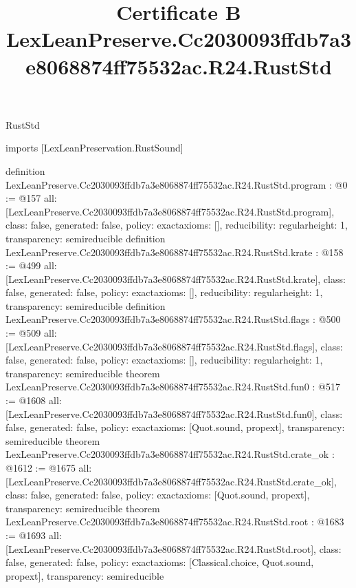 \begin{lexlean}{RustStd}
\title{Certificate B LexLeanPreserve.Cc2030093ffdb7a3e8068874ff75532ac.R24.RustStd}
\begin{coremodule}
imports [LexLeanPreservation.RustSound]

definition LexLeanPreserve.Cc2030093ffdb7a3e8068874ff75532ac.R24.RustStd.program : @0 := @157 {
  all: [LexLeanPreserve.Cc2030093ffdb7a3e8068874ff75532ac.R24.RustStd.program],
  class: false,
  generated: false,
  policy: exact{axioms: []},
  reducibility: regular{height: 1},
  transparency: semireducible
}
definition LexLeanPreserve.Cc2030093ffdb7a3e8068874ff75532ac.R24.RustStd.krate : @158 := @499 {
  all: [LexLeanPreserve.Cc2030093ffdb7a3e8068874ff75532ac.R24.RustStd.krate],
  class: false,
  generated: false,
  policy: exact{axioms: []},
  reducibility: regular{height: 1},
  transparency: semireducible
}
definition LexLeanPreserve.Cc2030093ffdb7a3e8068874ff75532ac.R24.RustStd.flags : @500 := @509 {
  all: [LexLeanPreserve.Cc2030093ffdb7a3e8068874ff75532ac.R24.RustStd.flags],
  class: false,
  generated: false,
  policy: exact{axioms: []},
  reducibility: regular{height: 1},
  transparency: semireducible
}
theorem LexLeanPreserve.Cc2030093ffdb7a3e8068874ff75532ac.R24.RustStd.fun0 : @517 := @1608 {
  all: [LexLeanPreserve.Cc2030093ffdb7a3e8068874ff75532ac.R24.RustStd.fun0],
  class: false,
  generated: false,
  policy: exact{axioms: [Quot.sound, propext]},
  transparency: semireducible
}
theorem LexLeanPreserve.Cc2030093ffdb7a3e8068874ff75532ac.R24.RustStd.crate_ok : @1612 := @1675 {
  all: [LexLeanPreserve.Cc2030093ffdb7a3e8068874ff75532ac.R24.RustStd.crate_ok],
  class: false,
  generated: false,
  policy: exact{axioms: [Quot.sound, propext]},
  transparency: semireducible
}
theorem LexLeanPreserve.Cc2030093ffdb7a3e8068874ff75532ac.R24.RustStd.root : @1683 := @1693 {
  all: [LexLeanPreserve.Cc2030093ffdb7a3e8068874ff75532ac.R24.RustStd.root],
  class: false,
  generated: false,
  policy: exact{axioms: [Classical.choice, Quot.sound, propext]},
  transparency: semireducible
}


\end{coremodule}
\end{lexlean}

